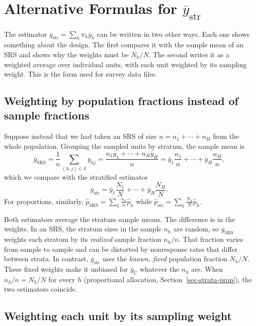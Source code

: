 \documentclass[
  letterpaper,
  DIV=11,
  numbers=noendperiod]{scrreprt}
\renewcommand{\[}{\begin{equation}}
\renewcommand{\]}{\end{equation}}
\begin{document}
\section{\texorpdfstring{Alternative Formulas for
\(\overline y_{\text{str}}\)}{Alternative Formulas for \textbackslash overline y\_\{\textbackslash text\{str\}\}}}\label{sec-strata-alt-formulas}

The estimator \(\overline y_{\text{str}} = \sum_h \pi_h \overline y_h\)
can be written in two other ways. Each one shows something about the
design. The first compares it with the sample mean of an SRS and shows
why the weights must be \(N_h/N\). The second writes it as a weighted
average over individual units, with each unit weighted by its sampling
weight. This is the form used for survey data files.

\subsection{Weighting by population fractions instead of sample
fractions}\label{sec-strata-vs-srs-formulas}

Suppose instead that we had taken an SRS of size \(n=n_1+\cdots+n_H\)
from the whole population. Grouping the sampled units by stratum, the
sample mean is \[
\overline y_{\text{SRS}} = \frac{1}{n}\sum_{(h,j)\in\mathcal S} y_{hj}
 = \frac{n_1\overline y_1 + \cdots + n_H\overline y_H}{n}
 = \overline y_1\frac{n_1}{n} + \cdots + \overline y_H\frac{n_H}{n},
\] which we compare with the stratified estimator \[
\overline y_{\text{str}} = \overline y_1\frac{N_1}{N} + \cdots + \overline y_H\frac{N_H}{N}.
\] For proportions, similarly,
\(\hat p_{\text{SRS}} = \sum_{h} \frac{n_h}{n}\hat p_h\) while
\(\hat p_{\text{str}} = \sum_{h} \frac{N_h}{N}\hat p_h\).

Both estimators average the stratum sample means. The difference is in
the weights. In an SRS, the stratum sizes in the sample \(n_h\) are
random, so \(\overline y_{\text{SRS}}\) weights each stratum by its
\emph{realized} sample fraction \(n_h/n\). That fraction varies from
sample to sample and can be distorted by nonresponse rates that differ
between strata. In contrast, \(\overline y_{\text{str}}\) uses the
\emph{known, fixed} population fraction \(N_h/N\). These fixed weights
make it unbiased for \(\overline y_U\) whatever the \(n_h\) are. When
\(n_h/n = N_h/N\) for every \(h\) (proportional allocation,
Section~\ref{sec-strata-prop}), the two estimators coincide.

\subsection{Weighting each unit by its sampling
weight}\label{sec-strata-weights}
\end{document}
